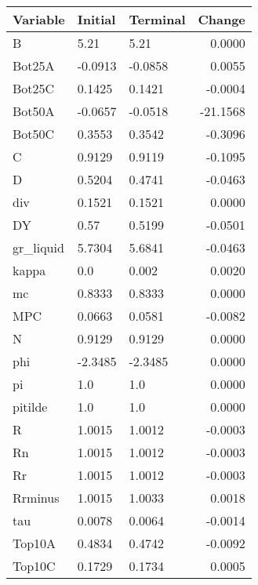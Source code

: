 \begin{table}
\centering
\label{tab:stst_comparison_no_ZLB_wedge_permanent}
\begin{tabular}{lllr}
\toprule
                Variable & Initial & Terminal &   Change \\
\midrule
                       B &    5.21 &     5.21 &   0.0000 \\
                  Bot25A & -0.0913 &  -0.0858 &   0.0055 \\
                  Bot25C &  0.1425 &   0.1421 &  -0.0004 \\
                  Bot50A & -0.0657 &  -0.0518 & -21.1568 \\
                  Bot50C &  0.3553 &   0.3542 &  -0.3096 \\
                       C &  0.9129 &   0.9119 &  -0.1095 \\
                       D &  0.5204 &   0.4741 &  -0.0463 \\
                     div &  0.1521 &   0.1521 &   0.0000 \\
                      DY &    0.57 &   0.5199 &  -0.0501 \\
               gr\_liquid &  5.7304 &   5.6841 &  -0.0463 \\
                   kappa &     0.0 &    0.002 &   0.0020 \\
                      mc &  0.8333 &   0.8333 &   0.0000 \\
                     MPC &  0.0663 &   0.0581 &  -0.0082 \\
                       N &  0.9129 &   0.9129 &   0.0000 \\
                     phi & -2.3485 &  -2.3485 &   0.0000 \\
                      pi &     1.0 &      1.0 &   0.0000 \\
                 pitilde &     1.0 &      1.0 &   0.0000 \\
                       R &  1.0015 &   1.0012 &  -0.0003 \\
                      Rn &  1.0015 &   1.0012 &  -0.0003 \\
                      Rr &  1.0015 &   1.0012 &  -0.0003 \\
                 Rrminus &  1.0015 &   1.0033 &   0.0018 \\
                     tau &  0.0078 &   0.0064 &  -0.0014 \\
                  Top10A &  0.4834 &   0.4742 &  -0.0092 \\
                  Top10C &  0.1729 &   0.1734 &   0.0005 \\

\end{tabular}
\end{table}
